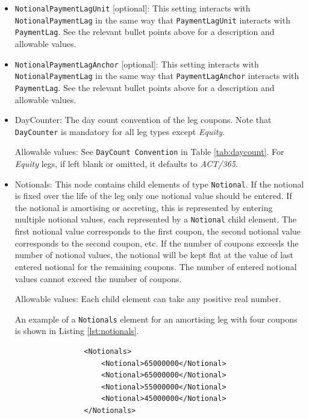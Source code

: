 \begin{itemize}
\item \lstinline!NotionalPaymentLagUnit! [optional]:
This setting interacts with \lstinline!NotionalPaymentLag! in the same way that \lstinline!PaymentLagUnit! interacts 
with \lstinline!PaymentLag!. See the relevant bullet points above for a description and allowable values.

\item \lstinline!NotionalPaymentLagAnchor! [optional]:
This setting interacts with \lstinline!NotionalPaymentLag! in the same way that \lstinline!PaymentLagAnchor! interacts 
with \lstinline!PaymentLag!. See the relevant bullet points above for a description and allowable values.

\item DayCounter: The day count convention of the leg coupons. Note that \lstinline!DayCounter! is mandatory for all leg types except \emph{Equity}.

Allowable values: See \lstinline!DayCount Convention! in Table \ref{tab:daycount}. For \emph{Equity} legs, if left blank or omitted, it defaults to \emph{ACT/365}.

\item Notionals: This node contains child elements of type
  \lstinline!Notional!. If the notional is fixed over the life of the
  leg only one notional value should be entered. If the notional is
  amortising or accreting, this is represented by entering multiple
  notional values, each represented by a \lstinline!Notional! child
  element. The first notional value corresponds to the first coupon,
  the second notional value corresponds to the second coupon, etc. If
  the number of coupons exceeds the number of notional values, the
  notional will be kept flat at the value of last entered notional for
  the remaining coupons.  The number of entered notional values cannot
  exceed the number of coupons.

Allowable values: Each child element can take any positive real number.

\vspace{1em}

An example of a \lstinline!Notionals! element for an amortising leg with four coupons is shown in Listing \ref{lst:notionals}.
\begin{listing}[H]
\begin{verbatim}
                <Notionals>
                    <Notional>65000000</Notional>
                    <Notional>65000000</Notional>
                    <Notional>55000000</Notional>
                    <Notional>45000000</Notional>
                </Notionals>
\end{verbatim}
\caption{Notional list}
\label{lst:notionals}
\end{listing}


\end{itemize}
